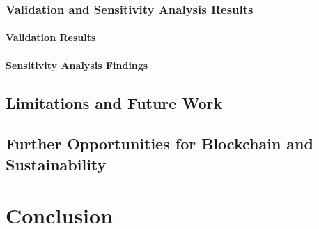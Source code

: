 \documentclass[11pt]{report}
\begin{document}
\subsection{Validation and Sensitivity Analysis Results}
\subsubsection{Validation Results}
\subsubsection{Sensitivity Analysis Findings}

\section{Limitations and Future Work} \label{se:limitations}
\section{Further Opportunities for Blockchain and Sustainability}

\chapter{Conclusion}



\end{document}
